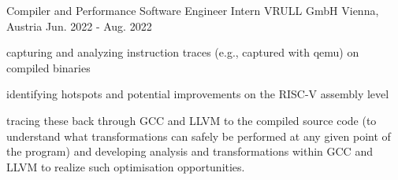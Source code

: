 
\begin{cventries}

  \cventry
    {Compiler and Performance Software Engineer Intern} %
    {VRULL GmbH} %
    {Vienna, Austria} %
    {Jun. 2022 - Aug. 2022} %
    {
      \begin{cvitems} %
        \item {capturing and analyzing instruction traces (e.g., captured with qemu) on compiled binaries}
	\item {identifying hotspots and potential improvements on the RISC-V assembly level}
	\item {tracing these back through GCC and LLVM to the compiled source code (to understand what
transformations can safely be performed at any given point of the program) and developing
analysis and transformations within GCC and LLVM to realize such optimisation opportunities.}
      \end{cvitems}
    }


\end{cventries}
